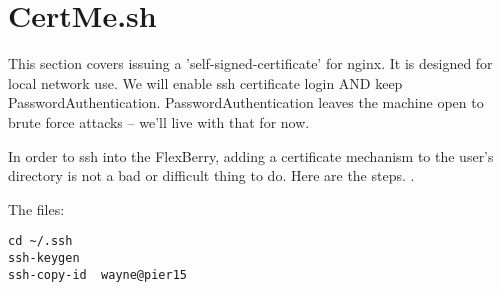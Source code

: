 \section{CertMe.sh}   \label{sec:CertMe}

This section covers issuing a 'self-signed-certificate' for nginx.
It is designed for local network use. We will enable ssh certificate
login AND keep PasswordAuthentication. PasswordAuthentication leaves
the machine open to brute force attacks -- we'll live with that for
now.

In order to ssh into the FlexBerry, adding a certificate mechanism
to the user's directory is not a bad or difficult thing to do.
Here are the steps. .

The files:

\begingroup \fontsize{10pt}{10pt}
\selectfont
\begin{verbatim} 
cd ~/.ssh
ssh-keygen
ssh-copy-id  wayne@pier15
\end{verbatim}
\endgroup





